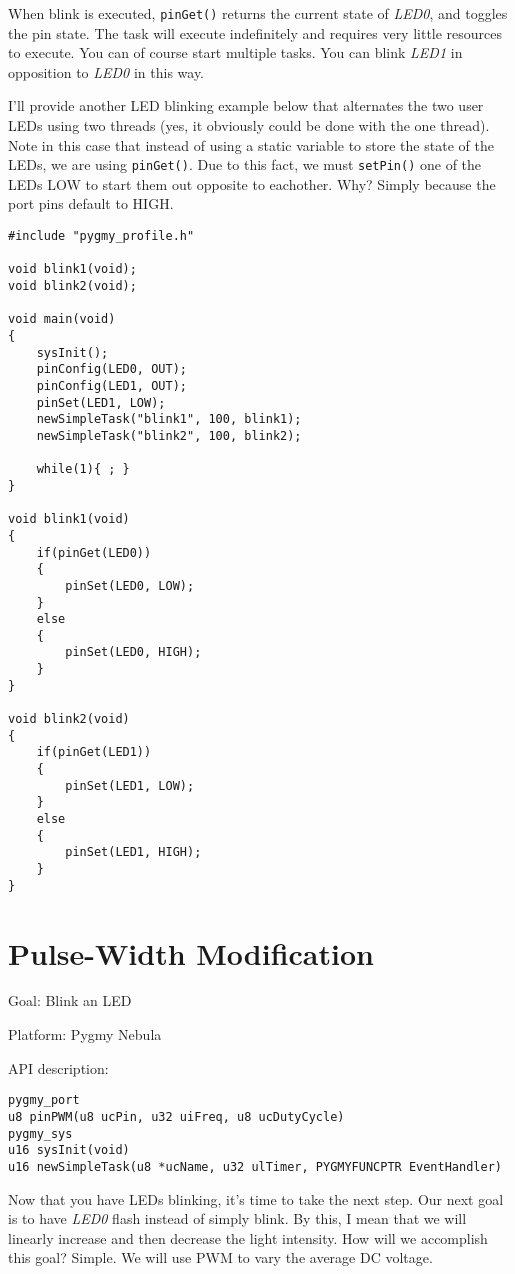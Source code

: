 \documentclass{article}
\begin{document}
When blink is executed, \verb|pinGet()| returns the current state of \emph{LED0}, and toggles the pin state. The task will execute indefinitely and requires very little resources to execute. You can of course start multiple tasks. You can blink \emph{LED1} in opposition to \emph{LED0} in this way.

I'll provide another LED blinking example below that alternates the two user LEDs using two threads (yes, it obviously could be done with the one thread). Note in this case that instead of using a static variable to store the state of the LEDs, we are using \verb|pinGet()|. Due to this fact, we must \verb|setPin()| one of the LEDs LOW to start them out opposite to eachother. Why? Simply because the port pins default to HIGH.

\begin{lstlisting}
#include "pygmy_profile.h"

void blink1(void);
void blink2(void);

void main(void)
{
	sysInit();
	pinConfig(LED0, OUT);
	pinConfig(LED1, OUT);
	pinSet(LED1, LOW);
	newSimpleTask("blink1", 100, blink1);
	newSimpleTask("blink2", 100, blink2);

	while(1){ ; }
}

void blink1(void)
{
	if(pinGet(LED0))
	{
		pinSet(LED0, LOW);
	}
	else
	{
		pinSet(LED0, HIGH);
	}
}

void blink2(void)
{
	if(pinGet(LED1))
	{
		pinSet(LED1, LOW);
	}
	else
	{
		pinSet(LED1, HIGH);
	}
}
\end{lstlisting}

\section{Pulse-Width Modification}

Goal: Blink an LED

Platform: Pygmy Nebula

API description:

\begin{lstlisting}
pygmy_port
u8 pinPWM(u8 ucPin, u32 uiFreq, u8 ucDutyCycle)
pygmy_sys
u16 sysInit(void)
u16 newSimpleTask(u8 *ucName, u32 ulTimer, PYGMYFUNCPTR EventHandler)
\end{lstlisting}

Now that you have LEDs blinking, it's time to take the next step. Our next goal is to have \emph{LED0} flash instead of simply blink. By this, I mean that we will linearly increase and then decrease the light intensity. How will we accomplish this goal? Simple. We will use \ac{PWM} to vary the average DC voltage.
\end{document}
